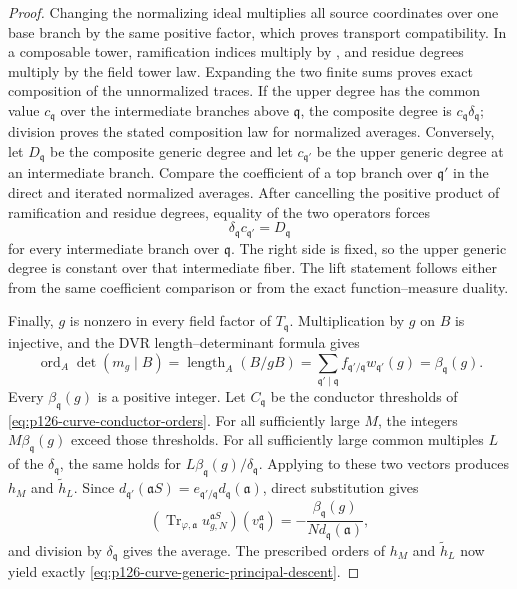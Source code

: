 \begin{proof}
Changing the normalizing ideal multiplies all source coordinates over one
base branch by the same positive factor, which proves transport
compatibility.  In a composable tower, ramification indices multiply by
\cite[Tag~0BRL]{StacksProject}, and residue degrees multiply by the field
tower law.  Expanding the two finite sums proves exact composition of the
unnormalized traces.  If the upper degree has the common value \(c_{\mathfrak
q}\) over the intermediate branches above \(\mathfrak q\), the composite
degree is \(c_{\mathfrak q}\delta_{\mathfrak q}\); division proves the
stated composition law for normalized averages.
Conversely, let \(D_{\mathfrak q}\) be the composite generic degree and let
\(c_{\mathfrak q'}\) be the upper generic degree at an intermediate branch.
Compare the coefficient of a top branch over \(\mathfrak q'\) in the direct
and iterated normalized averages.  After cancelling the positive product of
ramification and residue degrees, equality of the two operators forces
\[
                   \delta_{\mathfrak q}c_{\mathfrak q'}=D_{\mathfrak q}
\]
for every intermediate branch over \(\mathfrak q\).  The right side is
fixed, so the upper generic degree is constant over that intermediate fiber.
The lift statement follows either from the same coefficient comparison or from
the exact function--measure duality.

Finally, \(g\) is nonzero in every field factor of
\(T_{\mathfrak q}\).  Multiplication by \(g\) on \(B\) is injective, and
the DVR length--determinant formula
\cite[\emph{Lengths and determinants}, Tag~02QA]{stacks-project} gives
\[
 \operatorname{ord}_A\det(m_g\mid B)
   =\operatorname{length}_A(B/gB)
   =\sum_{\mathfrak q'\mid\mathfrak q}
      f_{\mathfrak q'/\mathfrak q}w_{\mathfrak q'}(g)
   =\beta_{\mathfrak q}(g).
\]
Every \(\beta_{\mathfrak q}(g)\) is a positive integer.  Let
\(C_{\mathfrak q}\) be the conductor thresholds of
\eqref{eq:p126-curve-conductor-orders}.  For all sufficiently large \(M\),
the integers \(M\beta_{\mathfrak q}(g)\) exceed those thresholds.  For all
sufficiently large common multiples \(L\) of the
\(\delta_{\mathfrak q}\), the same holds for
\(L\beta_{\mathfrak q}(g)/\delta_{\mathfrak q}\).  Applying
 to these two vectors
produces \(h_M\) and \(\widetilde h_L\).  Since
\(d_{\mathfrak q'}(\mathfrak aS)
 =e_{\mathfrak q'/\mathfrak q}d_{\mathfrak q}(\mathfrak a)\), direct
substitution gives
\[
 (\operatorname{Tr}_{\varphi,\mathfrak a}
       u^{\mathfrak aS}_{g,N})(v_{\mathfrak q}^{\mathfrak a})
   =-\frac{\beta_{\mathfrak q}(g)}
           {N d_{\mathfrak q}(\mathfrak a)},
\]
and division by \(\delta_{\mathfrak q}\) gives the average.  The prescribed
orders of \(h_M\) and \(\widetilde h_L\) now yield exactly
\eqref{eq:p126-curve-generic-principal-descent}.
\end{proof}

